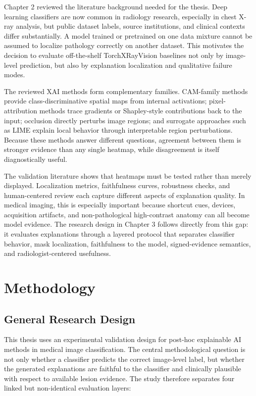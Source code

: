 Chapter 2 reviewed the literature background needed for the thesis. Deep
learning classifiers are now common in radiology research, especially in
chest X-ray analysis, but public dataset labels, source institutions,
and clinical contexts differ substantially. A model trained or
pretrained on one data mixture cannot be assumed to localize pathology
correctly on another dataset. This motivates the decision to
evaluate off-the-shelf TorchXRayVision baselines not only by image-level
prediction, but also by explanation localization and qualitative failure
modes.

The reviewed XAI methods form complementary families. CAM-family methods
provide class-discriminative spatial maps from internal activations;
pixel-attribution methods trace gradients or Shapley-style contributions
back to the input; occlusion directly perturbs image regions; and
surrogate approaches such as LIME explain local behavior through
interpretable region perturbations. Because these methods answer
different questions, agreement between them is stronger evidence than
any single heatmap, while disagreement is itself diagnostically useful.

The validation literature shows that heatmaps must be tested rather than
merely displayed. Localization metrics, faithfulness curves, robustness
checks, and human-centered review each capture different aspects of
explanation quality. In medical imaging, this is especially important
because shortcut cues, devices, acquisition artifacts, and
non-pathological high-contrast anatomy can all become model evidence.
The research design in Chapter 3 follows directly from this gap: it
evaluates explanations through a layered protocol that separates
classifier behavior, mask localization, faithfulness to the model,
signed-evidence semantics, and radiologist-centered usefulness.

\hypertarget{methodology}{%
	\chapter{Methodology}\label{methodology}}

\hypertarget{general-research-design}{%
	\section{General Research Design}\label{general-research-design}}

This thesis uses an experimental validation design for post-hoc
explainable AI methods in medical image classification. The central
methodological question is not only whether a classifier predicts the
correct image-level label, but whether the generated explanations are
faithful to the classifier and clinically plausible with respect to
available lesion evidence. The study therefore separates four linked but
non-identical evaluation layers:

